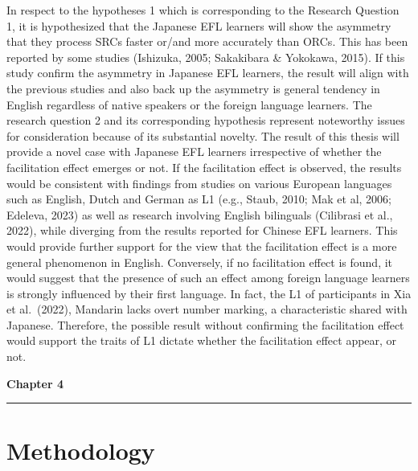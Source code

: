 \documentclass[
]{article}
\begin{document}
\vspace{1em}

In respect to the hypotheses 1 which is corresponding to the Research
Question 1, it is hypothesized that the Japanese EFL learners will show
the asymmetry that they process SRCs faster or/and more accurately than
ORCs. This has been reported by some studies (Ishizuka, 2005; Sakakibara
\& Yokokawa, 2015). If this study confirm the asymmetry in Japanese EFL
learners, the result will align with the previous studies and also back
up the asymmetry is general tendency in English regardless of native
speakers or the foreign language learners. The research question 2 and
its corresponding hypothesis represent noteworthy issues for
consideration because of its substantial novelty. The result of this
thesis will provide a novel case with Japanese EFL learners irrespective
of whether the facilitation effect emerges or not. If the facilitation
effect is observed, the results would be consistent with findings from
studies on various European languages such as English, Dutch and German
as L1 (e.g., Staub, 2010; Mak et al, 2006; Edeleva, 2023) as well as
research involving English bilinguals (Cilibrasi et al., 2022), while
diverging from the results reported for Chinese EFL learners. This would
provide further support for the view that the facilitation effect is a
more general phenomenon in English. Conversely, if no facilitation
effect is found, it would suggest that the presence of such an effect
among foreign language learners is strongly influenced by their first
language. In fact, the L1 of participants in Xia et al.~(2022), Mandarin
lacks overt number marking, a characteristic shared with Japanese.
Therefore, the possible result without confirming the facilitation
effect would support the traits of L1 dictate whether the facilitation
effect appear, or not.

\newpage

\clearpage
\thispagestyle{empty}  %
\vspace*{-1cm}
\begin{flushleft}
\Huge \textbf{Chapter 4}
\end{flushleft}
\vspace{0.3cm}
\noindent\rule{\linewidth}{0.6pt}
\pagestyle{fancy}  %

\section{Methodology}\label{methodology}
\end{document}
